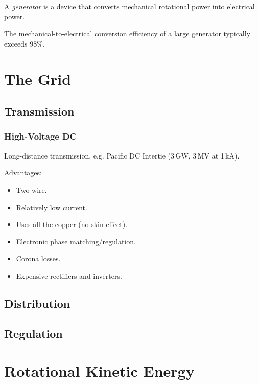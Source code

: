 \documentclass[11pt]{article}
\begin{document}
A \emph{generator} is a device that converts mechanical rotational
power into electrical power.

The mechanical-to-electrical conversion efficiency of a large
generator typically exceeds 98\%.



\section{The Grid}

\subsection{Transmission}

\subsubsection{High-Voltage DC}

Long-distance transmission, e.g. Pacific DC Intertie (3\,\unit{GW}, 3\,\unit{MV} at 1\,\unit{kA}).

Advantages:
\begin{itemize}
  \item Two-wire. 
  \item Relatively low current. 
  \item Uses all the copper (no skin effect).
  \item Electronic phase matching/regulation.
\end{itemize}

\begin{itemize}
  \item Corona losses.
  \item Expensive rectifiers and inverters.
\end{itemize}

\subsection{Distribution}


\subsection{Regulation}





\section{Rotational Kinetic Energy}
\end{document}
